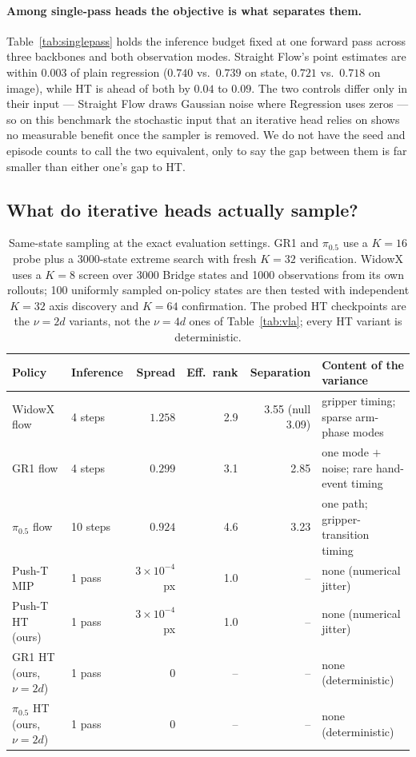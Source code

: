 \paragraph{Among single-pass heads the objective is what separates them.}
Table~\ref{tab:singlepass} holds the inference budget fixed at one forward pass
across three backbones and both observation modes. Straight Flow's point
estimates are within $0.003$ of plain regression ($0.740$ vs.\ $0.739$ on state,
$0.721$ vs.\ $0.718$ on image), while HT is ahead of both by $0.04$ to $0.09$.
The two controls differ only in their input --- Straight Flow draws Gaussian
noise where Regression uses zeros --- so on this benchmark the stochastic input
that an iterative head relies on shows no measurable benefit once the sampler is
removed. We do not have the seed and episode counts to call the two equivalent,
only to say the gap between them is far smaller than either one's gap to HT.

\subsection{What do iterative heads actually sample?}
\label{sec:exp:modes}

\begin{table}[t]
\centering
\caption{Same-state sampling at the exact evaluation settings. GR1 and
$\pi_{0.5}$ use a $K{=}16$ probe plus a 3000-state extreme search with fresh
$K{=}32$ verification. WidowX uses a $K{=}8$ screen over 3000 Bridge states
and 1000 observations from its own rollouts; 100 uniformly sampled on-policy
states are then tested with independent $K{=}32$ axis discovery and $K{=}64$
confirmation. The probed HT checkpoints are the $\nu = 2d$ variants, not the
$\nu = 4d$ ones of Table~\ref{tab:vla}; every HT variant is deterministic.}
\label{tab:modes}
\begin{tabular}{llrrrl}
\toprule
Policy & Inference & Spread & Eff.\ rank & Separation & Content of the variance \\
\midrule
WidowX flow                     & 4 steps  & $1.258$ & 2.9 & 3.55 (null 3.09) & gripper timing; sparse arm-phase modes \\
GR1 flow                        & 4 steps  & $0.299$ & 3.1 & 2.85 & one mode $+$ noise; rare hand-event timing \\
$\pi_{0.5}$ flow                 & 10 steps & $0.924$ & 4.6 & 3.23 & one path; gripper-transition timing \\
Push-T MIP                      & 1 pass   & $3\times10^{-4}$ px & 1.0 & -- & none (numerical jitter) \\
Push-T HT (ours)                & 1 pass   & $3\times10^{-4}$ px & 1.0 & -- & none (numerical jitter) \\
GR1 HT (ours, $\nu = 2d$)        & 1 pass   & $0$ & -- & -- & none (deterministic) \\
$\pi_{0.5}$ HT (ours, $\nu = 2d$)& 1 pass   & $0$ & -- & -- & none (deterministic) \\
\bottomrule
\end{tabular}
\end{table}

